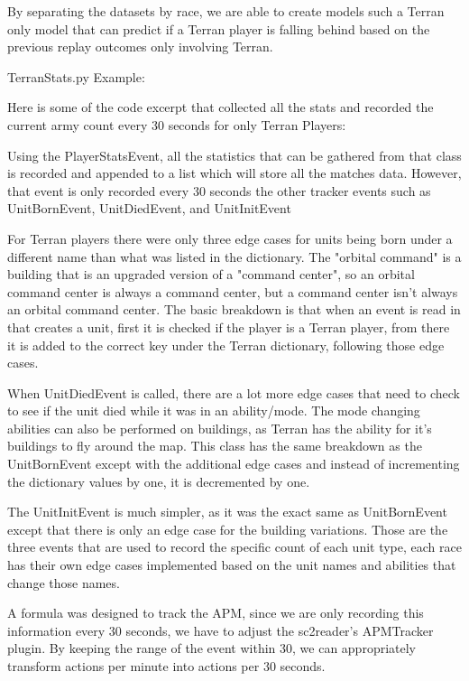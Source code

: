 \documentclass[a4paper,12pt]{report}
\begin{document}
By separating the datasets by race, we are able to create models such a Terran only model that can predict if a Terran player is falling behind based on the previous replay outcomes only involving Terran. 


TerranStats.py Example:

Here is some of the code excerpt that collected all the stats and recorded the current army count every 30 seconds for only Terran Players:


Using the PlayerStatsEvent, all the statistics that can be gathered from that class is recorded and appended to a list which will store all the matches data. However, that event is only recorded every 30 seconds the other tracker events such as UnitBornEvent, UnitDiedEvent, and UnitInitEvent 


For Terran players there were only three edge cases for units being born under a different name than what was listed in the dictionary. The "orbital command" is a building that is an upgraded version of a "command center", so an orbital command center is always a command center, but a command center isn’t always an orbital command center. The basic breakdown is that when an event is read in that creates a unit, first it is checked if the player is a Terran player, from there it is added to the correct key under the Terran dictionary, following those edge cases.


When UnitDiedEvent is called, there are a lot more edge cases that need to check to see if the unit died while it was in an ability/mode. The mode changing abilities can also be performed on buildings, as Terran has the ability for it’s buildings to fly around the map. This class has the same breakdown as the UnitBornEvent except with the additional edge cases and instead of incrementing the dictionary values by one, it is decremented by one. 


The UnitInitEvent is much simpler, as it was the exact same as UnitBornEvent except that there is only an edge case for the building variations. Those are the three events that are used to record the specific count of each unit type, each race has their own edge cases implemented based on the unit names and abilities that change those names. 

A formula was designed to track the APM, since we are only recording this information every 30 seconds, we have to adjust the sc2reader’s APMTracker plugin. By keeping the range of the event within 30, we can appropriately transform actions per minute into actions per 30 seconds. 
\end{document}
